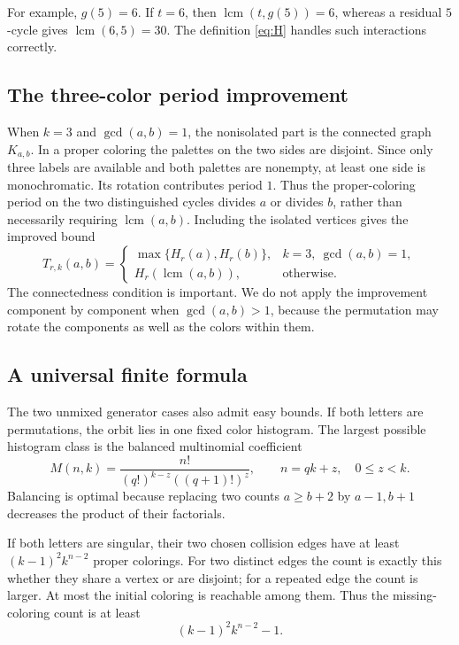 \documentclass[11pt,a4paper]{article}
\numberwithin{equation}{section}
\theoremstyle{definition}
\theoremstyle{remark}
\newcommand{\lcm}{\operatorname{lcm}}
\begin{document}
For example, $g(5)=6$. If $t=6$, then $\lcm(t,g(5))=6$, whereas a residual
$5$-cycle gives $\lcm(6,5)=30$. The definition \eqref{eq:H} handles such
interactions correctly.

\subsection{The three-color period improvement}

When $k=3$ and $\gcd(a,b)=1$, the nonisolated part is the connected graph
$K_{a,b}$. In a proper coloring the palettes on the two sides are disjoint.
Since only three labels are available and both palettes are nonempty, at
least one side is monochromatic. Its rotation contributes period $1$.
Thus the proper-coloring period on the two distinguished cycles divides
$a$ or divides $b$, rather than necessarily requiring $\lcm(a,b)$.
Including the isolated vertices gives the improved bound
\begin{equation}\label{eq:periodimprove}
 T_{r,k}(a,b)=
 \begin{cases}
 \max\{H_r(a),H_r(b)\},&k=3,\ \gcd(a,b)=1,\\
 H_r(\lcm(a,b)),&\text{otherwise}.
 \end{cases}
\end{equation}
The connectedness condition is important. We do not apply the improvement
component by component when $\gcd(a,b)>1$, because the permutation may rotate
the components as well as the colors within them.

\subsection{A universal finite formula}

The two unmixed generator cases also admit easy bounds. If both letters
are permutations, the orbit lies in one fixed color histogram. The largest
possible histogram class is the balanced multinomial coefficient
\[
 M(n,k)=\frac{n!}{(q!)^{k-z}((q+1)!)^z},\qquad n=qk+z,\quad0\le z<k.
\]
Balancing is optimal because replacing two counts $a\ge b+2$ by $a-1,b+1$
decreases the product of their factorials.

If both letters are singular, their two chosen collision edges have at
least $(k-1)^2k^{n-2}$ proper colorings. For two distinct edges the count is
exactly this whether they share a vertex or are disjoint; for a repeated
edge the count is larger. At most the initial coloring is reachable among
them. Thus the missing-coloring count is at least
\[
 (k-1)^2k^{n-2}-1.
\]
\end{document}
